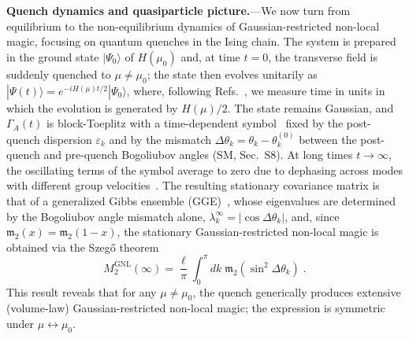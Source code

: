 \documentclass[aps,prl,twocolumn,superscriptaddress,reprint,longbibliography,nofootinbib]{revtex4-2}
\begin{document}
\textbf{Quench dynamics and quasiparticle picture.}---We now turn from equilibrium to the non-equilibrium dynamics of Gaussian-restricted non-local magic, focusing on quantum quenches in the Ising chain.
The system is prepared in the ground state $|\Psi_0\rangle$ of $H(\mu_0)$ and, at time $t=0$, the transverse field is suddenly quenched to $\mu \neq \mu_0$; the state then evolves unitarily as $|\Psi(t)\rangle = e^{-iH(\mu)t/2}|\Psi_0\rangle$, where, following Refs.~\cite{Calabrese2005evolution,Fagotti2008}, we measure time in units in which the evolution is generated by $H(\mu)/2$.
The state remains Gaussian, and $\Gamma_A(t)$ is block-Toeplitz with a time-dependent symbol~\cite{Calabrese2005evolution} fixed by the post-quench dispersion $\varepsilon_k$ and by the mismatch $\Delta\theta_k = \theta_k - \theta_k^{(0)}$ between the post-quench and pre-quench Bogoliubov angles (SM, Sec.~S8).
At long times $t\to\infty$, the oscillating terms of the symbol average to zero due to dephasing across modes with different group velocities~\cite{Calabrese2005evolution}.
The resulting stationary covariance matrix is that of a generalized Gibbs ensemble (GGE)~\cite{Calabrese2005evolution,vidmar2017entanglement}, whose eigenvalues are determined by the Bogoliubov angle mismatch alone, $\lambda_k^\infty=|\cos\Delta\theta_k|$,
 and, since $\mathfrak{m}_2(x)=\mathfrak{m}_2(1-x)$, the stationary Gaussian-restricted non-local magic is obtained via the Szeg\H{o} theorem~\cite{Calabrese2005evolution}
\begin{equation}
    M_2^{\mathrm{GNL}}(\infty) = \frac{\ell}{\pi}\int_0^\pi\! dk\; \mathfrak{m}_2\!\left(\sin^2\!\Delta\theta_k\right)\;.
    \label{eq:mnl_stationary}
\end{equation}
This result reveals that for any $\mu\neq \mu_0$, the quench generically produces extensive (volume-law) Gaussian-restricted non-local magic; the expression is symmetric under $\mu \leftrightarrow \mu_0$.
\end{document}
